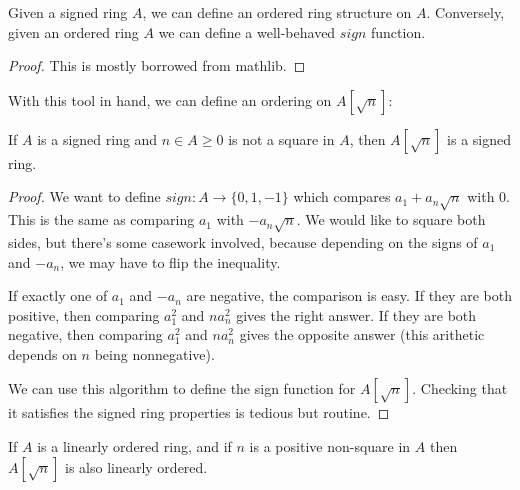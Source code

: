 \begin{lemma}
  \label{thm:orderFromSign}
  \leanok
  Given a signed ring $A$, we can define an ordered ring structure on $A$.
  Conversely, given an ordered ring $A$ we can define a well-behaved $sign$
  function.
\end{lemma}

\begin{proof}
  \leanok
  This is mostly borrowed from mathlib.
\end{proof}

With this tool in hand, we can define an ordering on $A[\sqrt{n}]$:

\begin{definition}
  \label{def:adjoinSign}
  \leanok
  If $A$ is a signed ring and $n ∈ A \geq 0$ is not a square in $A$, then
  $A[\sqrt{n}]$ is a signed ring.
\end{definition}

\begin{proof}
  We want to define $sign : A → \{0,1,-1\}$ which compares $a_1 + a_n\sqrt{n}$
  with 0. This is the same as comparing $a_1$ with $-a_n\sqrt{n}$. We would
  like to square both sides, but there's some casework involved, because
  depending on the signs of $a_1$ and $-a_n$, we may have to flip the
  inequality.

  If exactly one of $a_1$ and $-a_n$ are negative, the comparison is easy. If they
  are both positive, then comparing $a_1^2$ and $na_n^2$ gives the right
  answer. If they are both negative, then comparing $a_1^2$ and $na_n^2$ gives
  the opposite answer (this arithetic depends on $n$ being nonnegative).

  We can use this algorithm to define the sign function for $A[\sqrt{n}]$.
  Checking that it satisfies the signed ring properties is tedious but routine.
\end{proof}

\begin{corollary}
  \label{thm:adjoinOrderedRing}
  If $A$ is a linearly ordered ring, and if $n$ is a positive non-square in $A$
  then $A[\sqrt{n}]$ is also linearly ordered.
\end{corollary}


